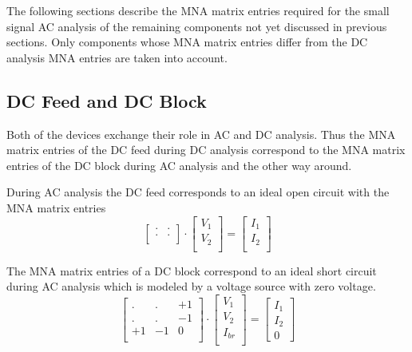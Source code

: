 The following sections describe the MNA matrix entries required for
the small signal AC analysis of the remaining components not yet
discussed in previous sections.  Only components whose MNA matrix
entries differ from the DC analysis MNA entries are taken into
account.

\subsection{DC Feed and DC Block}

Both of the devices exchange their role in AC and DC analysis.  Thus
the MNA matrix entries of the DC feed during DC analysis correspond to
the MNA matrix entries of the DC block during AC analysis and the
other way around.

\addvspace{12pt}

During AC analysis the DC feed corresponds to an ideal open circuit
with the MNA matrix entries
\begin{equation}
\begin{bmatrix}
. & .\\
. & .\\
\end{bmatrix}
\cdot
\begin{bmatrix}
V_1\\
V_2\\
\end{bmatrix}
=
\begin{bmatrix}
I_1\\
I_2\\
\end{bmatrix}
\end{equation}

The MNA matrix entries of a DC block correspond to an ideal short
circuit during AC analysis which is modeled by a voltage source with
zero voltage.
\begin{equation}
\begin{bmatrix}
. & . & +1\\
. & . & -1\\
+1 & -1 & 0\\
\end{bmatrix}
\cdot
\begin{bmatrix}
V_1\\
V_2\\
I_{br}\\
\end{bmatrix}
=
\begin{bmatrix}
I_1\\
I_2\\
0
\end{bmatrix}
\end{equation}

